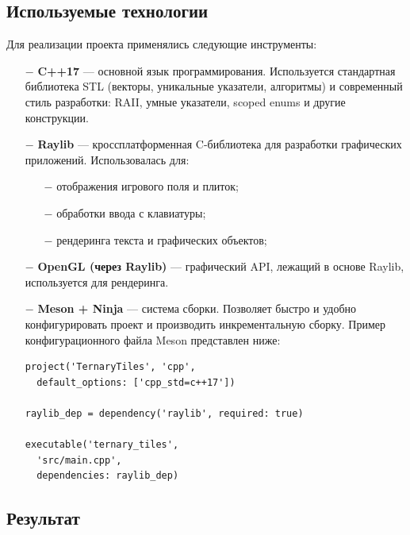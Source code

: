 \documentclass[oneside,a4paper,14pt]{extarticle}
\begin{document}
\clearpage

\subsection{Используемые технологии}

Для реализации проекта применялись следующие инструменты:

\begin{itemize}
    \item[$-$] \textbf{C++17} — основной язык программирования. Используется стандартная библиотека STL (векторы, уникальные указатели, алгоритмы) и современный стиль разработки: RAII, умные указатели, scoped enums и другие конструкции.
    
    \item[$-$] \textbf{Raylib} — кроссплатформенная C-библиотека для разработки графических приложений. Использовалась для:
    \begin{itemize}
        \item[$-$] отображения игрового поля и плиток;
        \item[$-$] обработки ввода с клавиатуры;
        \item[$-$] рендеринга текста и графических объектов;
    \end{itemize}

    \item[$-$] \textbf{OpenGL (через Raylib)} — графический API, лежащий в основе Raylib, используется для рендеринга.

    \item[$-$] \textbf{Meson + Ninja} — система сборки. Позволяет быстро и удобно конфигурировать проект и производить инкрементальную сборку. Пример конфигурационного файла Meson представлен ниже:

\begin{verbatim}
project('TernaryTiles', 'cpp',
  default_options: ['cpp_std=c++17'])

raylib_dep = dependency('raylib', required: true)

executable('ternary_tiles',
  'src/main.cpp',
  dependencies: raylib_dep)
\end{verbatim}

\end{itemize}

\subsection{Результат}
\end{document}
